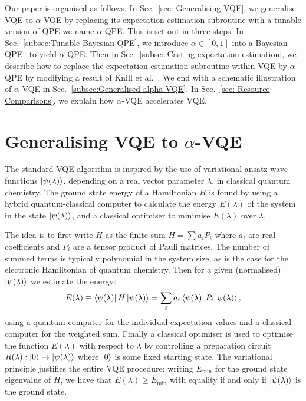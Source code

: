 \documentclass[twocolumn,
 reprint,
 amsmath,amssymb,
 aps,
 floatfix,
superscriptaddress
]{revtex4-1}
\begin{document}
Our paper is organised as follows. In Sec.~\ref{sec: Generalising VQE}, we generalise VQE to $\alpha$-VQE
by replacing its expectation estimation subroutine with a tunable
version of QPE we name $\alpha$-QPE. This is set out in three steps. In Sec.~\ref{subsec:Tunable Bayesian QPE}, we introduce $\alpha\in[0,1]$ into a Bayesian QPE~\cite{Wiebe2016}
to yield $\alpha$-QPE. Then in Sec.~\ref{subsec:Casting expectation estimation},
we describe how to replace the expectation estimation subroutine
within VQE by $\alpha$-QPE by modifying a result of Knill et al.~\cite{Knill2007}. We end with a schematic illustration of $\alpha$-VQE in Sec.~\ref{subsec:Generalised alpha VQE}. In Sec.~\ref{sec: Resource Comparisons}, we explain how $\alpha$-VQE accelerates VQE.


\section{\label{sec: Generalising VQE} Generalising VQE to $\alpha$-VQE}

The standard VQE algorithm is inspired by the use of variational ansatz
wave-functions $\Ket{\psi(\lambda)}$, depending on a real vector parameter $\lambda$,
in classical quantum chemistry. The ground state energy of a Hamiltonian
$H$ is found by using a hybrid quantum-classical computer to calculate the energy $E(\lambda)$ 
of the system in the state $\Ket{\psi(\lambda)}$, and
a classical optimiser to minimise $E(\lambda)$ over $\lambda$.

The idea is to first write $H$ as the finite sum $H=\sum a_{i}P_{i}$
where $a_{i}$ are real coefficients and $P_{i}$ are a tensor product of 
Pauli matrices.
The number of summed terms is typically polynomial in the system size, as is the case for the electronic Hamiltonian of quantum chemistry. Then for a given (normalised) $\Ket{\psi(\lambda)}$ we estimate the energy:
\begin{equation}\label{weighted sum}
    E(\lambda)\equiv\Bra{\psi(\lambda)}H\ket{\psi(\lambda)}=\sum_{i} a_{i}\Bra{\psi(\lambda)}P_{i}\Ket{\psi(\lambda)},
\end{equation}
using a quantum computer for the individual expectation values and a classical computer for the weighted sum. Finally a classical optimiser is used to optimise the function $E(\lambda)$ with respect to $\lambda$ by controlling a preparation circuit $R(\lambda):\Ket{0}\mapsto\Ket{\psi(\lambda)}$
where $\Ket{0}$ is some fixed starting state. The variational principle justifies the entire VQE procedure: writing $E_{\text{min}}$ for
the ground state eigenvalue of $H$, we have that $E(\lambda)\geq E_{\text{min}}$
with equality if and only if $\Ket{\psi(\lambda)}$ is the ground
state.
\end{document}
